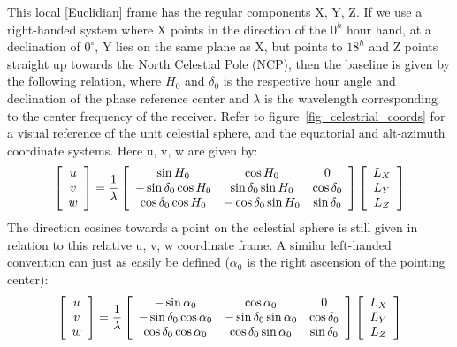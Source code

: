 \documentclass[a4paper,10pt]{report}
\begin{document}
This local [Euclidian] frame has the regular components X, Y, Z. If we use a right-handed system where X points in the direction 
of the $0^h$ hour hand, at a declination of $0^{\circ}$, Y lies on the same plane as X, but points to $18^h$ and Z points straight up 
towards the North Celestial Pole (NCP), then the baseline is given by the following relation, where $H_0$ and $\delta_0$ is the 
respective hour angle and declination of the phase reference center and $\lambda$ is the wavelength corresponding to the center 
frequency of the receiver. Refer to figure~\ref{fig_celestrial_coords} for a visual reference of the unit celestial sphere, and 
the equatorial and alt-azimuth coordinate systems. Here u, v, w are given by:
\begin{equation}
 \label{EQN_RIGHTHANDED_SYSTEM}
 \left[\begin{array}{c}
     u\\
     v \\
     w \\
    \end{array}\right] = \frac{1}{\lambda}
 \left[\begin{array}{c c c}
     \sin{H_0} 			& \cos{H_0}			& 0 \\
     -\sin{\delta_0}\cos{H_0} 	& \sin{\delta_0}\sin{H_0}	& \cos{\delta_0}\\
     \cos{\delta_0}\cos{H_0} 	& -\cos{\delta_0}\sin{H_0}	& \sin{\delta_0}\\
    \end{array}\right]   
 \left[\begin{array}{c}
     L_X \\
     L_Y \\
     L_Z \\
    \end{array}\right]
\end{equation}
The direction cosines towards a point on the celestial sphere is still given in relation to this relative u, v, w coordinate frame.
A similar left-handed convention can just as easily be defined ($\alpha_0$ is the right ascension of the pointing center):
\begin{equation}
 \left[\begin{array}{c}
     u\\
     v \\
     w \\
    \end{array}\right] = \frac{1}{\lambda}
 \left[\begin{array}{c c c}
     -\sin{\alpha_0} 			& \cos{\alpha_0}		& 0 \\
     -\sin{\delta_0}\cos{\alpha_0} 	& -\sin{\delta_0}\sin{\alpha_0}	& \cos{\delta_0}\\
     \cos{\delta_0}\cos{\alpha_0} 	& \cos{\delta_0}\sin{\alpha_0}	& \sin{\delta_0}\\
    \end{array}\right]   
 \left[\begin{array}{c}
     L_X \\
     L_Y \\
     L_Z \\
    \end{array}\right]
\end{equation}
\end{document}
